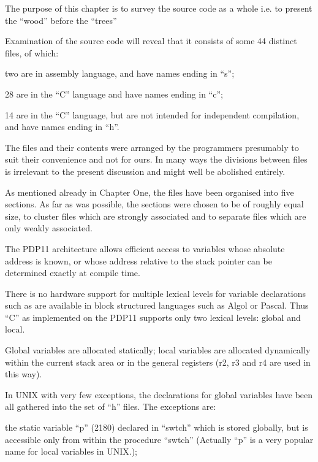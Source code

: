 %
%

The purpose of this chapter is to survey 
the source code as a whole i.e. to
present the ``wood'' before the ``trees''


Examination of the source code will
reveal that it consists of some 44 distinct 
files, of which:

\bi
\item two are in assembly language, and
have names ending in ``s'';

\item 28 are in the ``C'' language and
have names ending in ``c'';

\item 14 are in the ``C'' language, but
are not intended for independent
compilation, and have names ending
in ``h''.
\ei

The files and their contents were
arranged by the programmers presumably
to suit their convenience and not for
ours. In many ways the divisions
between files is irrelevant to the
present discussion and might well be
abolished entirely.

As mentioned already in Chapter One,
the files have been organised into five
sections. As far as was possible, the
sections were chosen to be of roughly
equal size, to cluster files which are
strongly associated and to separate
files which are only weakly associated.



The PDP11 architecture allows efficient
access to variables whose absolute
address is known, or whose address
relative to the stack pointer can be
determined exactly at compile time.


There is no hardware support for multiple 
lexical levels for variable
declarations such as are available in
block structured languages such as
Algol or Pascal. Thus ``C'' as implemented 
on the PDP11 supports only two
lexical levels: global and local.


Global variables are allocated statically;
local variables are allocated
dynamically within the current stack
area or in the general registers (r2,
r3 and r4 are used in this way).



In UNIX with very few exceptions, the
declarations for global variables have
been all gathered into the set of ``h''
files. The exceptions are:

\bd
\item[(a)] the static variable ``p'' (2180)
declared in ``swtch'' which is
stored globally, but is accessible 
only from within the procedure 
``swtch'' (Actually ``p'' is
a very popular name for local
variables in UNIX.);

